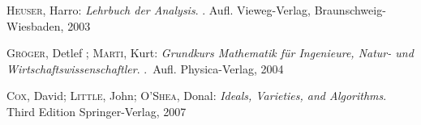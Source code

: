 \documentclass{article}
\begin{document}
\begin{thebibliography}{99}
	\textsc{Heuser}, Harro:
	\newblock \emph{Lehrbuch der Analysis}.
	. Aufl.
	\newblock Vieweg-Verlag, Braunschweig-Wiesbaden, 2003
	
	\textsc{Gr{\"o}ger}, Detlef ; \textsc{Marti}, Kurt:
	\newblock \emph{Grundkurs Mathematik für Ingenieure, Natur- und
		Wirtschaftswissenschaftler}.
	.~Aufl.
	\newblock Physica-Verlag, 2004

	\textsc{Cox}, David; \textsc{Little}, John; \textsc{O'Shea}, Donal:
	\newblock \emph{Ideals, Varieties, and Algorithms}.
	\newblock Third Edition
	\newblock Springer-Verlag, 2007
\end{thebibliography}
\end{document}
